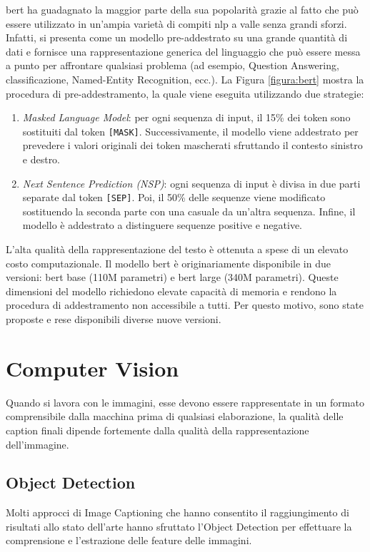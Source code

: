 \acrshort{bert} ha guadagnato la maggior parte della sua popolarità grazie al fatto che può essere utilizzato in un'ampia varietà di compiti \acrshort{nlp} a valle senza grandi sforzi. Infatti, si presenta come un modello pre-addestrato su una grande quantità di dati e fornisce una rappresentazione generica del linguaggio che può essere messa a punto per affrontare qualsiasi problema (ad esempio, Question Answering, classificazione, Named-Entity Recognition, ecc.). La Figura \ref{figura:bert} mostra la procedura di pre-addestramento, la quale viene eseguita utilizzando due strategie:
\begin{enumerate}
    \item \textit{Masked Language Model}: per ogni sequenza di input, il 15\% dei token sono sostituiti dal token \texttt{[MASK]}. Successivamente, il modello viene addestrato per prevedere i valori originali dei token mascherati sfruttando il contesto sinistro e destro.
    \item \textit{Next Sentence Prediction (NSP)}: ogni sequenza di input è divisa in due parti separate dal token \texttt{[SEP]}. Poi, il 50\% delle sequenze viene modificato sostituendo la seconda parte con una casuale da un'altra sequenza. Infine, il modello è addestrato a distinguere sequenze positive e negative.
\end{enumerate}
L'alta qualità della rappresentazione del testo è ottenuta a spese di un elevato costo computazionale. Il modello \acrshort{bert} è originariamente disponibile in due versioni: \acrshort{bert} base (110M parametri) e \acrshort{bert} large (340M parametri). Queste dimensioni del modello richiedono elevate capacità di memoria e rendono la procedura di addestramento non accessibile a tutti. 
Per questo motivo, sono state proposte e rese disponibili diverse nuove versioni.

\section{Computer Vision}
Quando si lavora con le immagini, esse devono essere rappresentate in un formato comprensibile dalla macchina prima di qualsiasi elaborazione, la qualità delle caption finali dipende fortemente dalla qualità della rappresentazione dell'immagine.
\subsection{Object Detection}
Molti approcci di Image Captioning che hanno consentito il raggiungimento di risultati allo stato dell'arte hanno sfruttato l'Object Detection per effettuare la comprensione e l'estrazione delle feature delle immagini.


